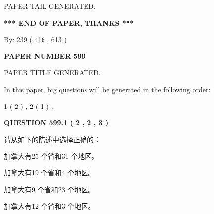 \documentclass{ctexart}
\begin{document}
   
   
   
   
   
 \vspace{0.2in}
 
   
   
\vspace{2.0in} PAPER TAIL GENERATED.
   
   
   
   
\vspace{1.0in} 
{\textbf{\large{ *** END OF PAPER, THANKS *** }}} 
   
   
\hspace{1.0in} By: 
 239 ( 416 ,  613 )
   
   
   
   
\newpage 
\setcounter{page}{ 
   599001 } 
   
   
   
   
 {\textbf{ \Large{ PAPER NUMBER  599  }}}
   
   
\vspace{0.2in}
   
   
   
   
   
   
   
   
 \vspace{0.2in}
 
 
 
 
   
   
 PAPER TITLE GENERATED.
   
   
   
\vspace{0.2in}
   
In this paper, big questions will be generated in the following order: 
   
   
   1 ( 2 )
 ,
   2 ( 1 )
 .
  
\vspace{0.2in}
  
{\textbf{\Large{QUESTION
599.1 
 ( 2 , 2 , 3 )
}}}
  
  
请从如下的陈述中选择正确的：
 
 
加拿大有25 个省和31 个地区。
 
 
加拿大有19 个省和4 个地区。
 
 
加拿大有9 个省和23 个地区。
 
 
加拿大有12 个省和3 个地区。
 
\end{document}

